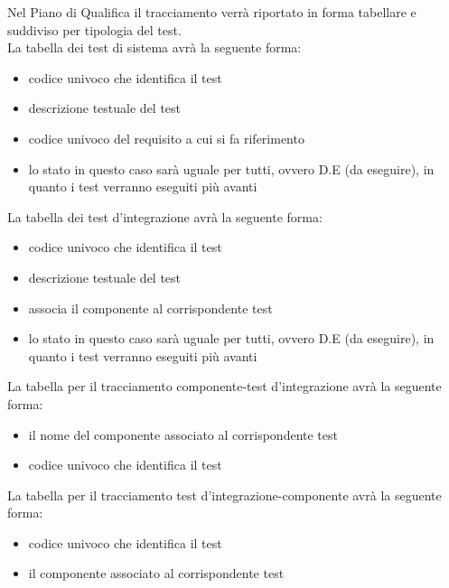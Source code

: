 Nel Piano di Qualifica il tracciamento verrà riportato in forma tabellare e suddiviso per tipologia del test.\\
La tabella dei test di sistema avrà la seguente forma:
\begin{itemize}
\item {}codice univoco che identifica il test
\item {} descrizione testuale del test
\item {}codice univoco del requisito a cui si fa riferimento
\item {}lo stato in questo caso sarà uguale per tutti, ovvero D.E (da eseguire), in quanto i test verranno eseguiti più avanti
\end{itemize}
La tabella dei test d'integrazione avrà la seguente forma:
\begin{itemize}
\item {}codice univoco che identifica il test
\item {} descrizione testuale del test
\item {} associa il componente al corrispondente test
\item {}lo stato in questo caso sarà uguale per tutti, ovvero D.E (da eseguire), in quanto i test verranno eseguiti più avanti
\end{itemize}

La tabella per il tracciamento componente-test d'integrazione avrà la seguente forma:
\begin{itemize}
\item {} il nome del componente associato al corrispondente test
\item {}codice univoco che identifica il test
\end{itemize}

La tabella per il tracciamento test d'integrazione-componente avrà la seguente forma:
\begin{itemize}
\item {}codice univoco che identifica il test
\item {} il componente associato al corrispondente test
\end{itemize}

